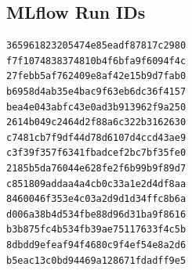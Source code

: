 \documentclass[10pt,a4paper,twocolumn]{article}
\begin{document}
\subsection*{MLflow Run IDs}

\begin{lstlisting}
365961823205474e85eadf87817c2980
f7f1074838374810b4f6bfa9f6094f4c
27febb5af762409e8af42e15b9d7fab0
b6958d4ab35e4bac9f63eb6dc36f4157
bea4e043abfc43e0ad3b913962f9a250
2614b049c2464d2f88a6c322b3162630
c7481cb7f9df44d78d6107d4ccd43ae9
c3f39f357f6341fbadcef2bc7bf35fe0
2185b5da76044e628fe2f6b99b9f89d7
c851809addaa4a4cb0c33a1e2d4df8aa
8460046f353e4c03a2d9d1d34ffc8b6a
d006a38b4d534fbe88d96d31ba9f8616
b3b875fc4b534fb39ae75117633f4c5b
8dbdd9efeaf94f4680c9f4ef54e8a2d6
b5eac13c0bd94469a128671fdadff9e5
\end{lstlisting}
\end{document}

